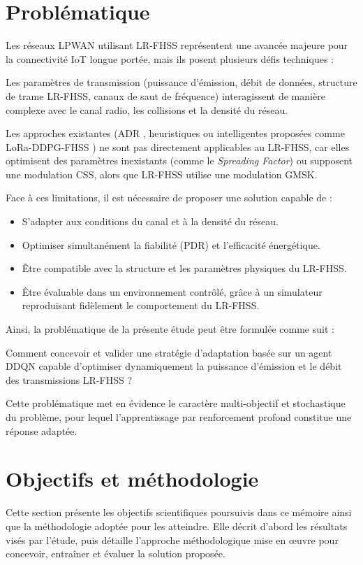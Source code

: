 \section{Problématique}

Les réseaux LPWAN utilisant LR-FHSS représentent une avancée majeure pour la connectivité IoT longue portée, mais ils posent plusieurs défis techniques :

Les paramètres de transmission (puissance d’émission, débit de données, structure de trame LR-FHSS, canaux de saut de fréquence) interagissent de manière complexe avec le canal radio, les collisions et la densité du réseau.

Les approches existantes (ADR \cite{Li2018ADRanalysis}, heuristiques ou intelligentes proposées comme LoRa-DDPG-FHSS \cite{greenlora,greenlora2024}) ne sont pas directement applicables au LR-FHSS, car elles optimisent des paramètres inexistants (comme le \textit{Spreading Factor}) ou supposent une modulation CSS, alors que LR-FHSS utilise une modulation GMSK.

Face à ces limitations, il est nécessaire de proposer une solution capable de :

\begin{itemize}
	\item S'adapter aux conditions du canal et à la densité du réseau.
	\item Optimiser simultanément la fiabilité (PDR) et l'efficacité énergétique.
	\item Être compatible avec la structure et les paramètres physiques du LR-FHSS.
	\item Être évaluable dans un environnement contrôlé, grâce à un simulateur reproduisant fidèlement le comportement du LR-FHSS.
\end{itemize}

Ainsi, la problématique de la présente étude peut être formulée comme suit :

Comment concevoir et valider une stratégie d'adaptation basée sur un agent DDQN capable d'optimiser dynamiquement la puissance d’émission et le débit des transmissions LR-FHSS ? 

Cette problématique met en évidence le caractère multi-objectif et stochastique du problème, pour lequel l'apprentissage par renforcement profond constitue une réponse adaptée.

\section{Objectifs et méthodologie}
Cette section présente les objectifs scientifiques poursuivis dans ce mémoire ainsi que la méthodologie adoptée pour les atteindre. Elle décrit d’abord les résultats visés par l’étude, puis détaille l’approche méthodologique mise en œuvre pour concevoir, entraîner et évaluer la solution proposée.

